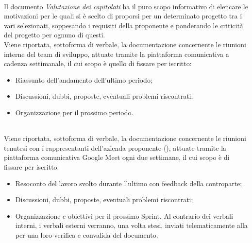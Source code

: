 \\
Il documento \textit{Valutazione dei capitolati} ha il puro scopo informativo di elencare le
motivazioni per le quali si è scelto di proporsi per un determinato progetto tra i vari selezionati,
soppesando i requisiti della proponente e ponderando le criticità del progetto per ognuno di questi.  
\\
Viene riportata, sottoforma di verbale, la documentazione concernente le riunioni interne del team
di sviluppo, attuate tramite la piattaforma comunicativa  a cadenza settimanale,
il cui scopo è quello di fissare per iscritto:
\begin{itemize}
    \item Riassunto dell'andamento dell'ultimo periodo;
    \item Discussioni, dubbi, proposte, eventuali problemi riscontrati;
    \item Organizzazione per il prossimo periodo.
\end{itemize}
\\
Viene riportata, sottoforma di verbale, la documentazione concernente le riunioni tenutesi con i
rappresentanti dell'azienda proponente (), attuate tramite la piattaforma comunicativa Google Meet ogni due settimane, il cui scopo è di fissare per iscritto:
\begin{itemize}
    \item Resoconto del lavoro svolto durante l'ultimo  con feedback della controparte;
    \item Discussioni, dubbi, proposte, eventuali problemi riscontrati;
    \item Organizzazione e obiettivi per il prossimo Sprint.
Al contrario dei verbali interni, i verbali esterni verranno, una volta stesi, inviati
        telematicamente alla  per una loro verifica e convalida del documento.
\end{itemize} 

